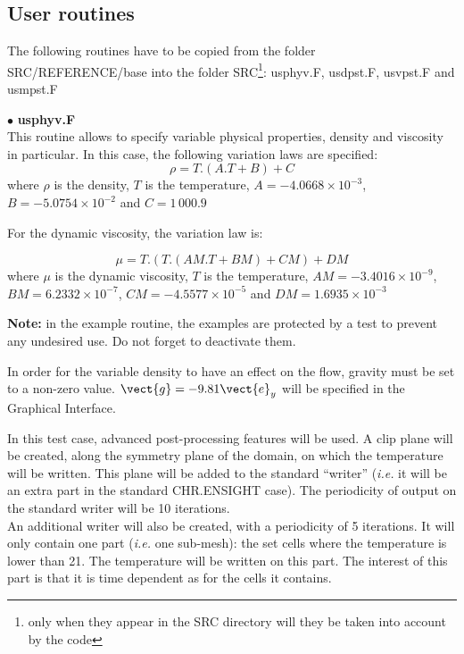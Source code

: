         \subsection{User routines}

The following routines have to be copied from the folder SRC/REFERENCE/base into the
folder SRC\footnote{only when they appear in the SRC directory will they be
taken into account by the code}: usphyv.F, usdpst.F, usvpst.F and usmpst.F


$\bullet$ {\bfseries usphyv.F}\\
This routine allows to specify variable physical properties, density and
viscosity in particular. In this case, the following variation laws are specified:
\begin{equation}
\rho = T.(A.T + B) + C
\end{equation}
where $\rho$ is the density, $T$ is the temperature, $A = -4.0668\times10^{-3}$,
$B =-5.0754\times 10^{-2}$ and $C = 1\,000.9$


For the dynamic viscosity, the variation law is:

\begin{equation}
\mu = T.(T.(AM.T + BM) + CM) + DM
\end{equation}
where $\mu$ is the dynamic viscosity, $T$ is the temperature,
$AM=-3.4016\times 10^{-9}$, $BM = 6.2332\times 10^{-7}$,
$CM = -4.5577\times 10^{-5}$ and $DM = 1.6935\times 10^{-3}$


\textbf{Note:} in the example routine, the examples are protected by a test to prevent any
undesired use. Do not forget to deactivate them.

In order for the variable density to have an effect on the flow, gravity must be
set to a non-zero value. $\vect{g} = -9.81 \vect{e}_y$ will be specified in the
Graphical Interface.


In this test case, advanced post-processing features will be used. A clip
plane will be created, along the symmetry plane of the domain, on which the
temperature will be written. This plane will be added to the standard
``writer'' ({\em i.e.} it will be an extra part in the standard CHR.ENSIGHT
case). The periodicity of output on the standard writer will be 10 iterations.\\
An additional writer will also be created, with a periodicity of 5
iterations. It will only contain one part ({\em i.e.} one sub-mesh): the set
cells where the temperature is lower than 21\degresC. The temperature will be
written on this part. The interest of this part is that it is time dependent
as for the cells it contains.

